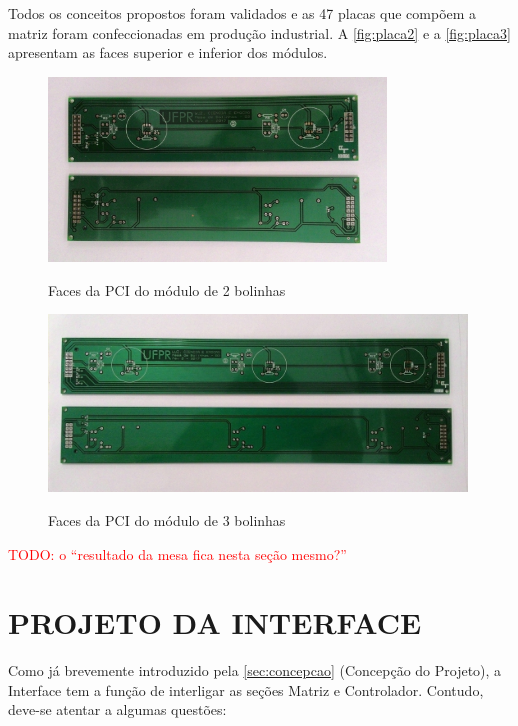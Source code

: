 Todos os conceitos propostos foram validados e as 47 placas que compõem a matriz foram confeccionadas em produção industrial. A \autoref{fig:placa2} e a \autoref{fig:placa3} apresentam as faces superior e inferior dos módulos.

\begin{figure}[H]
    \centering
    \caption{Faces da PCI do módulo de 2 bolinhas}
    \includegraphics[width=0.8\textwidth]{./dados/figuras/bloco-2}
    \label{fig:placa2}
\end{figure}

\begin{figure}[H]
    \centering
    \caption{Faces da PCI do módulo de 3 bolinhas}
    \includegraphics[width=0.99\textwidth]{./dados/figuras/bloco-3}
    \label{fig:placa3}
\end{figure}

\textcolor{red}{TODO: o ``resultado da mesa fica nesta seção mesmo?''}

\section{PROJETO DA INTERFACE}
\label{sec:interface}

Como já brevemente introduzido pela \autoref{sec:concepcao} (Concepção do Projeto), a Interface tem a função de interligar as seções Matriz e Controlador. Contudo, deve-se atentar a algumas questões:

